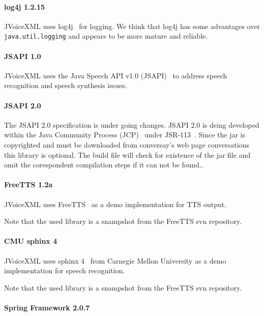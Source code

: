 \documentclass[11pt,a4paper]{article}
\begin{document}
\paragraph{log4j 1.2.15}

JVoiceXML uses log4j~\cite{apache:log4j} for logging. We think that log4j has 
some advantages
over \texttt{java.util.logging} and appears to be more mature and reliable.

\paragraph{JSAPI 1.0}

JVoiceXML uses the Java Speech API v1.0 (JSAPI)~\cite{sun:jsapi} to address 
speech recognition and speech synthesis issues.

\paragraph{JSAPI 2.0}

The JSAPI 2.0 specification is under going changes.
JSAPI 2.0 is deing developed within
the Java Community Process (JCP)~\cite{jcp} under 
JSR-113~\cite{jcp:jsr113}. Since the jar is copyrighted and must be downloaded
from conversay's web page conversations~\cite{conversay:jsr113}
this library is optional. The
build file will check for existence of the jar file and omit the corespondent compilation
steps if it can not be found..

\paragraph{FreeTTS 1.2a}

JVoiceXML uses FreeTTS~\cite{freetts} as a demo implementation for TTS output.

Note that the used library is a snampshot from the FreeTTS svn repository.

\paragraph{CMU sphinx 4}

JVoiceXML uses sphinx 4~\cite{sphinx} from Carnegie Mellon University
as a demo implementation for speech recognition.

Note that the used library is a snampshot from the FreeTTS svn repository.

\paragraph{Spring Framework 2.0.7}
\label{sec:spring-framework}
\end{document}
